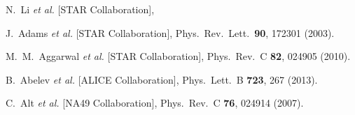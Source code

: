 \documentclass[aps,prc,nofootinbib,showpacs,superscriptaddress,groupedaddress]{revtex4-1}
\begin{document}
\begin{thebibliography}{99}
  N.~Li {\it et al.} [STAR Collaboration],

  J.~Adams {\it et al.} [STAR Collaboration],
  Phys.\ Rev.\ Lett.\  {\bf 90}, 172301 (2003).
   
  M.~M.~Aggarwal {\it et al.} [STAR Collaboration],
  Phys.\ Rev.\ C {\bf 82}, 024905 (2010).


  B.~Abelev {\it et al.} [ALICE Collaboration],
  Phys.\ Lett.\ B {\bf 723}, 267 (2013).
  
  C.~Alt {\it et al.} [NA49 Collaboration],
  Phys.\ Rev.\ C {\bf 76}, 024914 (2007).


\end{thebibliography}
\end{document}
